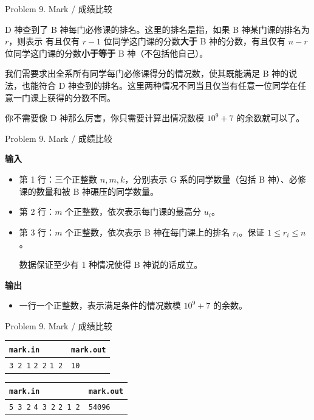 \documentclass[UTF8]{beamer}
\begin{document}
\begin{frame}{Problem 9. Mark / 成绩比较}

D 神查到了 B 神每门必修课的排名。这里的排名是指，如果 B 神某门课的排名为 $r$，则表示
有且仅有 $r - 1$ 位同学这门课的分数\textbf{大于} B 神的分数，有且仅有 $n - r$
位同学这门课的分数\textbf{小于等于} B 神（不包括他自己）。

我们需要求出全系所有同学每门必修课得分的情况数，使其既能满足 B 神的说法，也能符合
D 神查到的排名。这里两种情况不同当且仅当有任意一位同学在任意一门课上获得的分数不同。

你不需要像 D 神那么厉害，你只需要计算出情况数模 $10^9 + 7$ 的余数就可以了。

\end{frame}

\begin{frame}{Problem 9. Mark / 成绩比较}

\textbf{输入}
\begin{itemize}
    \item 第 1 行：三个正整数 $n, m, k$，分别表示 G 系的同学数量（包括 B 神）、必修课的数量和被 B 神碾压的同学数量。
    \item 第 2 行：$m$ 个正整数，依次表示每门课的最高分 $u_i$。
    \item 第 3 行：$m$ 个正整数，依次表示 B 神在每门课上的排名 $r_i$。保证 $1 \leq r_i \leq n$。

    数据保证至少有 1 种情况使得 B 神说的话成立。
\end{itemize}
\textbf{输出}
\begin{itemize}
    \item 一行一个正整数，表示满足条件的情况数模 $10^9 + 7$ 的余数。
\end{itemize}

\end{frame}

\begin{frame}{Problem 9. Mark / 成绩比较}

\begin{tabularx}{\textwidth}{|X|X|}
\hline
\texttt{\textbf{mark.in}} & \texttt{\textbf{mark.out}} \\ \hline
\texttt{3 2 1}\newline
\texttt{2 2}\newline
\texttt{1 2}
&
\texttt{10}
\\ \hline
\end{tabularx}
\newline \newline

\begin{tabularx}{\textwidth}{|X|X|}
\hline
\texttt{\textbf{mark.in}} & \texttt{\textbf{mark.out}} \\ \hline
\texttt{5 3 2}\newline
\texttt{4 3 2}\newline
\texttt{2 1 2}
&
\texttt{54096}
\\ \hline
\end{tabularx}
\newline

\end{frame}
\end{document}
